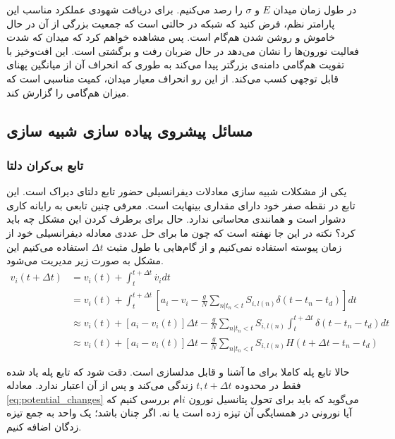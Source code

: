 \documentclass[12pt,onecolumn,a4paper]{article}
\begin{document}
در طول زمان میدان $E$ و $\sigma$ را رصد می‌کنیم. برای دریافت شهودی عملکرد مناسب این پارامتر نظم، فرض کنید که شبکه در حالتی است که جمعیت بزرگی از آن در حال خاموش و روشن شدن هم‌گام است. پس مشاهده خواهم کرد که میدان که شدت فعالیت نورون‌ها را نشان می‌دهد در حال ضربان رفت و برگشتی است. این افت‌وخیز با تقویت هم‌گامی دامنه‌ی بزرگتر پیدا می‌کند به طوری که انحراف آن از میانگین پهنای قابل توجهی کسب می‌کند. از این رو انحراف معیار میدان، کمیت مناسبی است که میزان هم‌گامی را گزارش کند.\\

\subsection{مسائل پیشروی پیاده سازی شبیه سازی}
\subsubsection{تابع بی‌کران دلتا}
یکی از مشکلات شبیه سازی معادلات دیفرانسیلی حضور تابع دلتای دیراک است. این تابع در نقطه صفر خود دارای مقداری بینهایت است. معرفی چنین تابعی به رایانه کاری دشوار است و همانندی محاساتی ندارد. حال برای برطرف کردن این مشکل چه باید کرد؟ نکته در این جا نهفته است که چون ما برای حل عددی معادله دیفرانسیلی خود از زمان پیوسته استفاده نمی‌کنیم و از گام‌هایی با طول مثبت $\Delta t$ استفاده می‌کنیم این مشکل به صورت زیر مدیریت می‌شود.
\begin{align}
v_{i}(t+\Delta t) &= v_{i}(t) + \int_{t}^{t+\Delta t} \dot{v_i}  dt \\
&= v_{i}(t) + \int_{t}^{t+\Delta t} \left[ a_i - v_i - \frac{g}{N} \sum_{n|t_n<t} S_{i,l(n)} \delta(t - t_n - t_d)  \right]   dt \\
&\approx v_{i}(t) +  \left[ a_i - v_i(t) \right] \Delta t - \frac{g}{N} \sum_{n|t_n<t} S_{i,l(n)} \int_{t}^{t+\Delta t} \delta(t - t_n - t_d) dt  \\
&\approx v_{i}(t) +  \left[ a_i - v_i(t) \right] \Delta t - \frac{g}{N} \sum_{n|t_n<t} S_{i,l(n)} H(t + \Delta t- t_n - t_d) \label{eq:potential_changes}
\end{align}

حالا تابع پله کاملا برای ما آشنا و قابل مدلسازی است. دقت شود که تابع پله یاد شده فقط در محدوده $t, t+\Delta t$ زندگی می‌کند و پس از آن اعتبار ندارد. معادله \ref{eq:potential_changes}  می‌گوید که باید برای تحول پتانسیل نورون $i$ام بررسی کنیم که آیا نورونی در همسایگی آن تیزه زده است یا نه. اگر چنان باشد؛ یک واحد به جمع تیزه زدگان اضافه کنیم.
\end{document}
